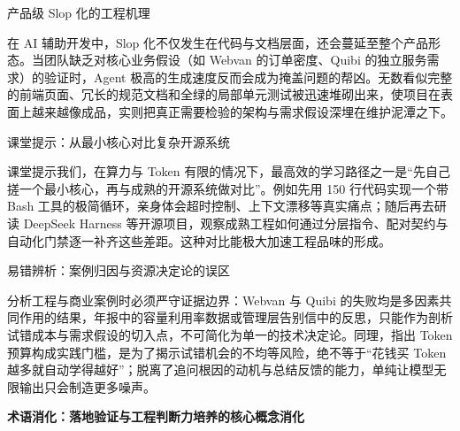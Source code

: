 \documentclass[UTF8,a4paper,11pt,fontset=fandol]{ctexart}
\begin{document}
\begin{importantbox}{产品级 Slop 化的工程机理}

在 AI 辅助开发中，Slop 化不仅发生在代码与文档层面，还会蔓延至整个产品形态。当团队缺乏对核心业务假设（如 Webvan 的订单密度、Quibi 的独立服务需求）的验证时，Agent 极高的生成速度反而会成为掩盖问题的帮凶。无数看似完整的前端页面、冗长的规范文档和全绿的局部单元测试被迅速堆砌出来，使项目在表面上越来越像成品，实则把真正需要检验的架构与需求假设深埋在维护泥潭之下。

\end{importantbox}

\begin{knowledgebox}{课堂提示：从最小核心对比复杂开源系统}

课堂提示我们，在算力与 Token 有限的情况下，最高效的学习路径之一是“先自己搓一个最小核心，再与成熟的开源系统做对比”。例如先用 150 行代码实现一个带 Bash 工具的极简循环，亲身体会超时控制、上下文漂移等真实痛点；随后再去研读 DeepSeek Harness 等开源项目，观察成熟工程如何通过分层指令、配对契约与自动化门禁逐一补齐这些差距。这种对比能极大加速工程品味的形成。

\end{knowledgebox}

\begin{warningbox}{易错辨析：案例归因与资源决定论的误区}

分析工程与商业案例时必须严守证据边界：Webvan 与 Quibi 的失败均是多因素共同作用的结果，年报中的容量利用率数据或管理层告别信中的反思，只能作为剖析试错成本与需求假设的切入点，不可简化为单一的技术决定论。同理，指出 Token 预算构成实践门槛，是为了揭示试错机会的不均等风险，绝不等于“花钱买 Token 越多就自动学得越好”；脱离了追问根因的动机与总结反馈的能力，单纯让模型无限输出只会制造更多噪声。

\end{warningbox}

\par{}\textbf{术语消化：落地验证与工程判断力培养的核心概念消化}
\end{document}
